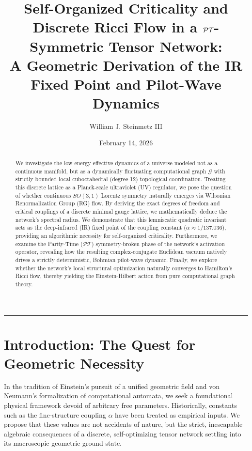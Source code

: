 \documentclass[11pt, letterpaper]{article}
\title{\vspace{-3em}\textbf{Self-Organized Criticality and Discrete Ricci Flow in a $\PT$-Symmetric Tensor Network:\\ \large A Geometric Derivation of the IR Fixed Point and Pilot-Wave Dynamics}}
\author[1]{William J. Steinmetz III}
\affil[1]{\textit{Foundational Ternary Dynamics Research}}
\date{February 14, 2026}
\newcommand{\PT}{\mathcal{PT}}
\theoremstyle{definition}
\theoremstyle{remark}
\begin{document}
\maketitle

\begin{abstract}
We investigate the low-energy effective dynamics of a universe modeled not as a continuous manifold, but as a dynamically fluctuating computational graph $\mathcal{G}$ with strictly bounded local cuboctahedral (degree-12) topological coordination. Treating this discrete lattice as a Planck-scale ultraviolet (UV) regulator, we pose the question of whether continuous $SO(3,1)$ Lorentz symmetry naturally emerges via Wilsonian Renormalization Group (RG) flow. By deriving the exact degrees of freedom and critical couplings of a discrete minimal gauge lattice, we mathematically deduce the network's spectral radius. We demonstrate that this lemniscatic quadratic invariant acts as the deep-infrared (IR) fixed point of the coupling constant ($\alpha \approx 1/137.036$), providing an algorithmic necessity for self-organized criticality. Furthermore, we examine the Parity-Time ($\PT$) symmetry-broken phase of the network's activation operator, revealing how the resulting complex-conjugate Euclidean vacuum natively drives a strictly deterministic, Bohmian pilot-wave dynamic. Finally, we explore whether the network's local structural optimization naturally converges to Hamilton's Ricci flow, thereby yielding the Einstein-Hilbert action from pure computational graph theory.
\end{abstract}

\vspace{1em}
\hrule
\vspace{1.5em}

\section{Introduction: The Quest for Geometric Necessity}

In the tradition of Einstein's pursuit of a unified geometric field and von Neumann's formalization of computational automata, we seek a foundational physical framework devoid of arbitrary free parameters. Historically, constants such as the fine-structure coupling $\alpha$ have been treated as empirical inputs. We propose that these values are not accidents of nature, but the strict, inescapable algebraic consequences of a discrete, self-optimizing tensor network settling into its macroscopic geometric ground state.
\end{document}
